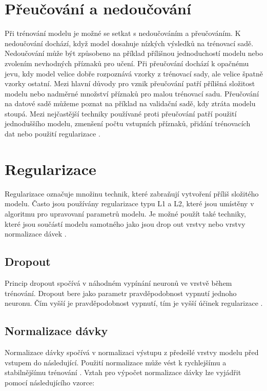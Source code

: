 \documentclass[FM,BP]{tulthesis}
\begin{document}
\section{Přeučování a nedoučování} %
Při trénování modelu je možné se setkat s nedoučováním a přeučováním. K nedoučování dochází, když model dosahuje nízkých výsledků na trénovací sadě. Nedoučování může být způsobeno na příklad přílišnou jednoduchostí modelu nebo zvolením nevhodných příznaků pro učení. Při přeučování dochází k opačnému jevu, kdy model velice dobře rozpoznává vzorky z trénovací sady, ale velice špatně vzorky ostatní. Mezi hlavní důvody pro vznik přeučování patří přílišná složitost modelu nebo nadměrné množství příznaků pro malou trénovací sadu. Přeučování na datové sadě můžeme poznat na příklad na validační sadě, kdy ztráta modelu stoupá. Mezi nejčastější techniky používané proti přeučování patří použití jednoduššího modelu, zmenšení počtu vstupních příznaků, přidání trénovacích dat nebo použití regularizace \cite{burkov2019hundred}.

\section{Regularizace} %
Regularizace označuje množinu technik, které zabraňují vytvoření příliš složitého modelu. Často jsou používány regularizace typu L1 a L2, které jsou umístěny v algoritmu pro upravovaní parametrů modelu. Je možné použít také techniky, které jsou součástí modelu samotného jako jsou drop out vrstvy nebo vrstvy normalizace dávek \cite{burkov2019hundred}.

\subsection{Dropout} %
Princip dropout spočívá v náhodném vypínání neuronů ve vrstvě během trénování. Dropout bere jako parametr pravděpodobnost vypnutí jednoho neuronu. Čím vyšší je pravděpodobnost vypnutí, tím je vyšší účinek regularizace \cite{burkov2019hundred}.

\subsection{Normalizace dávky} %
Normalizace dávky spočívá v normalizaci výstupu z předešlé vrstvy modelu před vstupem do následující. Použití normalizace může vést k rychlejšímu a stabilnějšímu trénování \cite{burkov2019hundred}. Vztah pro výpočet normalizace dávky lze vyjádřit pomocí následujícího vzorce:
\end{document}
